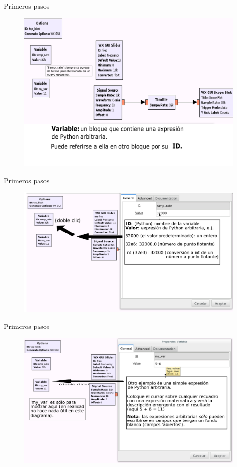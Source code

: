 \begin{frame}{Primeros pasos}
\begin{figure}[H]
\centering
\includegraphics[width=\textwidth, height=0.6\textwidth]{lab1/pdf/lab108.pdf}
\end{figure}
\end{frame}

\begin{frame}{Primeros pasos}
\begin{figure}[H]
\centering
\includegraphics[width=\textwidth]{lab1/pdf/lab109.pdf}
\end{figure}
\end{frame}

\begin{frame}{Primeros pasos}
\begin{figure}[H]
\centering
\includegraphics[width=\textwidth]{lab1/pdf/lab110.pdf}
\end{figure}
\end{frame}

